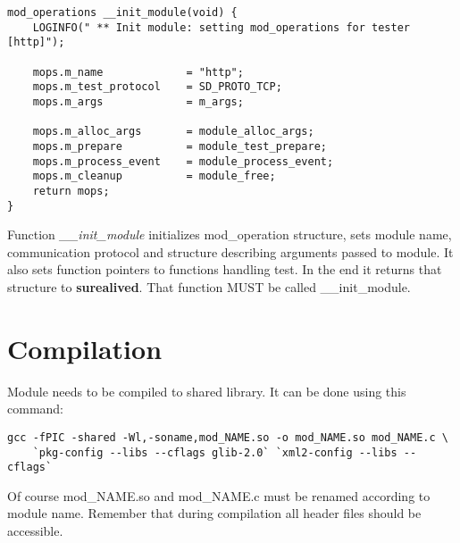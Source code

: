 \documentclass[polish,12pt]{article}
\begin{document}
\newpage
{\small
\begin{verbatim}
mod_operations __init_module(void) {
    LOGINFO(" ** Init module: setting mod_operations for tester [http]");

    mops.m_name             = "http";
    mops.m_test_protocol    = SD_PROTO_TCP;
    mops.m_args             = m_args;

    mops.m_alloc_args       = module_alloc_args;
    mops.m_prepare          = module_test_prepare;
    mops.m_process_event    = module_process_event;
    mops.m_cleanup          = module_free;
    return mops;
}
\end{verbatim}
}

Function \textit{\_\_init\_module} initializes mod\_operation structure, sets
module name, communication protocol and structure describing arguments passed
to module. It also sets function pointers to functions handling test.
In the end it returns that structure to \textbf{surealived}.
That function MUST be called \_\_init\_module.

\section{Compilation}
Module needs to be compiled to shared library. It can be done using this command:
\begin{verbatim}
gcc -fPIC -shared -Wl,-soname,mod_NAME.so -o mod_NAME.so mod_NAME.c \
    `pkg-config --libs --cflags glib-2.0` `xml2-config --libs --cflags`
\end{verbatim}
Of course mod\_NAME.so and mod\_NAME.c must be renamed according to
module name. Remember that during compilation all header files should
be accessible.
\end{document}
